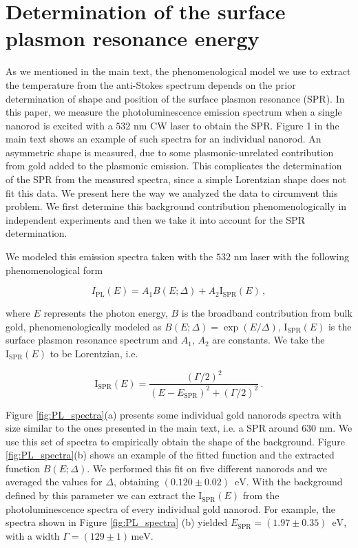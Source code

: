 \documentclass[journal=nalefd,manuscript=letter]{achemso}
\newcommand{\nm}{\ensuremath{\,\textrm{nm}}}
\newcommand{\eV}{\ensuremath{\,\textrm{eV}}}
\newcommand{\meV}{\ensuremath{\,\textrm{meV}}}
\begin{document}
\pagebreak
\section{Determination of the surface plasmon resonance energy}\label{sec:ISPR} 

As we mentioned in the main text, the phenomenological model we use to extract
the temperature from the anti-Stokes spectrum depends on the prior determination 
of shape and position of the surface plasmon resonance (SPR). 
In this paper, we measure the photoluminescence emission spectrum 
when a single nanorod is excited with a $532\,\nm$ CW laser to obtain the SPR. 
Figure 1 in the main text shows an example of such spectra for an individual nanorod. 
An asymmetric shape is measured, due to some plasmonic-unrelated contribution 
from gold\cite{Mooradian1969} added to the plasmonic emission. 
This complicates the determination of the SPR from the measured spectra, since a simple 
Lorentzian shape does not fit this data. 
We present here the way we analyzed the data to circumvent this problem.
We first determine this background contribution phenomenologically in independent experiments and then 
we take it into account for the SPR determination. 

We modeled this emission spectra taken with the $532$ nm laser with the following phenomenological form

\begin{equation}
I_{\textrm{PL}}(E) = A_1 B(E;\Delta) + A_2 \textrm{I}_\textrm{SPR}(E)\,,
\label{eq:spectra_model}
\end{equation}

where $E$ represents the photon energy, $B$ is the broadband contribution from bulk gold, 
phenomenologically modeled as $B(E;\Delta) = \exp(E/\Delta)$, $\textrm{I}_\textrm{SPR}(E)$ 
is the surface plasmon resonance spectrum and $A_1$, $A_2$ are constants. 
We take the $\textrm{I}_\textrm{SPR}(E)$ to be Lorentzian\cite{Zijlstra2011}, i.e.  

\begin{equation}
\textrm{I}_{\textrm{SPR}}(E) = 
	\frac{\left( \Gamma/2 \right)^2}{\left( E-E_\textrm{SPR}\right)^2 +\left( \Gamma/2 \right)^2}\,.
\label{eq:ISPR}
\end{equation}

Figure \ref{fig:PL_spectra}(a) presents some individual gold nanorods spectra with 
size similar to the ones presented in the main text, i.e. a %
SPR around $630$ nm. 
We use this set of spectra to empirically obtain the shape of the background.
Figure \ref{fig:PL_spectra}(b) shows an example of the fitted function and the extracted 
function $B(E;\Delta)$. We performed this fit on five different nanorods and we averaged 
the values for $\Delta$, obtaining $(0.120\pm0.02)$ \eV. With the background defined by 
this parameter we can extract the $\textrm{I}_{\textrm{SPR}}(E)$ from the photoluminescence 
spectra of every individual gold nanorod. For example, the spectra shown in Figure 
\ref{fig:PL_spectra} (b) yielded $E_\textrm{SPR}=(1.97 \pm 0.35)$ \eV, 
with a width $\Gamma=(129 \pm 1) \meV$.
\end{document}

